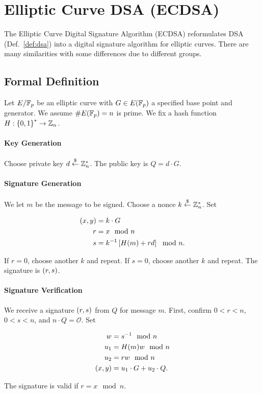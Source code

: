\section{Elliptic Curve DSA (ECDSA)}
\label{sec:ecdsa}

The Elliptic Curve Digital Signature Algorithm (ECDSA)
reformulates DSA (Def.~\ref{def:dsa})
into a digital signature algorithm for \glspl{elliptic curve}.
There are many similarities with some differences
due to different \glspl{group}.

\subsection{Formal Definition}

\begin{defn}
Let $E/\mathbb{F}_{p}$ be an \gls{elliptic curve} with $G\in E(\mathbb{F}_{p})$
a specified base point and generator.
We assume $\#E(\mathbb{F}_{p}) = n$ is prime.
We fix a \gls{hash function} $H:\left\{ 0,1 \right\}^{*}\to\mathbb{Z}_{n}$.

\paragraph{Key Generation}
Choose private key $d\stackrel{\$}{\leftarrow}{}\mathbb{Z}_{n}^{*}$.
The public key is $Q = d\cdot G$.

\paragraph{Signature Generation}
We let $m$ be the message to be signed.
Choose a \gls{nonce} $k\stackrel{\$}{\leftarrow}{}\mathbb{Z}_{n}^{*}$.
Set

\begin{align}
    \left( x,y \right) &= k\cdot G
        \nonumber\\
    r &= x \mod n
        \nonumber\\
    s &= k^{-1}\left[ H(m) + rd \right] \mod n.
\end{align}

\noindent
If $r = 0$, choose another $k$ and repeat.
If $s = 0$, choose another $k$ and repeat.
The signature is $\left( r,s \right)$.

\paragraph{Signature Verification}
We receive a signature $\left( r,s \right)$ from $Q$ for message $m$.
First, confirm $0 < r < n$, $0 < s < n$, and $n\cdot Q = \mathcal{O}$.
Set

\begin{align}
    w &= s^{-1} \mod n
        \nonumber\\
    u_{1} &= H(m)w \mod n
        \nonumber\\
    u_{2} &= rw \mod n
        \nonumber\\
    \left( x,y \right) &= u_{1}\cdot G + u_{2}\cdot Q.
\end{align}

\noindent
The signature is valid if $r = x \mod n$.
\end{defn}


